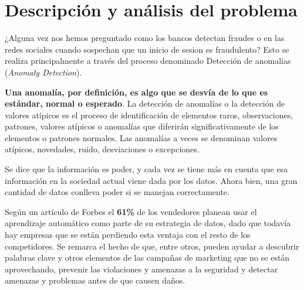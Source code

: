 \documentclass[12pt,twoside]{report}
\date{Curso 2020-2021}
\begin{document}



\clearpage{\pagestyle{empty}\cleardoublepage}
\setcounter{page}{1}
\pagestyle{fancy}



\begingroup
\pagestyle{plain}
\tableofcontents 
\endgroup

\setcounter{page}{1}
\fancyhead[LE,RO]{\slshape \rightmark}
\fancyhead[LO,RE]{\slshape \leftmark}

\chapter*{Descripción y análisis del problema}

¿Alguna vez nos hemos preguntado como los bancos detectan fraudes o en las redes sociales cuando sospechan que un inicio de sesion es fraudulento? Esto se realiza principalmente a través del proceso denominado Detección de anomalías (\textit{Anomaly Detection}).

\textbf{Una anomalía, por definición, es algo que se desvía de lo que es estándar, normal o esperado}. La detección de anomalías o la detección de valores atípicos es el proceso de identificación de elementos raros, observaciones, patrones, valores atípicos o anomalías que diferirán significativamente de los elementos o patrones normales. Las anomalías a veces se denominan valores atípicos, novedades, ruido, desviaciones o excepciones.

Se dice que la información es poder, y cada vez se tiene más en cuenta que esa información en la sociedad actual viene dada por los datos. Ahora bien, una gran cantidad de datos conlleva poder si se manejan correctamente. 

Según un artículo de Forbes \cite{forbes} el \textbf{61\%} de los vendedores planean usar el aprendizaje automático
como parte de su estrategia de datos, dado que todavía hay empresas que se están perdiendo esta
ventaja con el resto de los competidores. Se remarca el hecho de que, entre otros, pueden ayudar
a descubrir palabras clave y otros elementos de las campañas de marketing que no se están
aprovechando, prevenir las violaciones y amenazas a la seguridad y detectar amenazas y
problemas antes de que causen daños.
\end{document}
